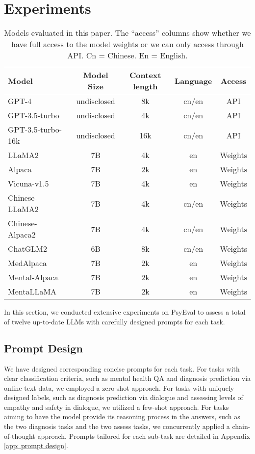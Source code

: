 
\section{Experiments}
\begin{table*}[t!]
\centering
\footnotesize
\begin{tabular}{l c c c c}
\hline
\textbf{Model} & \textbf{Model Size} & \textbf{Context length} & \textbf{Language} & \textbf{Access}\\
\hline
GPT-4~\cite{openai2023gpt4} & undisclosed & 8k & cn/en & API \\
GPT-3.5-turbo~\cite{schulman2022chatgpt} & undisclosed & 4k & cn/en & API\\
GPT-3.5-turbo-16k~\cite{schulman2022chatgpt} & undisclosed & 16k & cn/en & API\\
\hline
LLaMA2~\cite{touvron2023llama} & 7B & 4k & en & Weights\\
Alpaca~\cite{alpaca} & 7B & 2k & en & Weights\\
Vicuna-v1.5~\cite{chiang2023vicuna} & 7B & 4k & en & Weights\\
\hline
Chinese-LLaMA2~\cite{Chinese-LLaMA-Alpaca} & 7B & 4k & cn/en & Weights\\
Chinese-Alpaca2~\cite{Chinese-LLaMA-Alpaca} & 7B & 4k & cn/en & Weights\\
ChatGLM2~\cite{du2022glm, zeng2022glm} & 6B & 8k & cn/en & Weights\\
\hline
MedAlpaca~\cite{han2023medalpaca} & 7B & 2k & en & Weights\\
Mental-Alpaca~\cite{xu2023leveraging} & 7B & 2k & en & Weights\\
MentaLLaMA~\cite{yang2023mentalllama} & 7B & 2k & en & Weights\\
\hline
\end{tabular}
\caption{Models evaluated in this paper. The “access” columns show whether we have full access to the model weights or we can only access through API. Cn = Chinese. En = English.} 
\label{tab:models}
\end{table*}
In this section, we conducted extensive experiments on PsyEval to assess a total of twelve up-to-date LLMs with carefully designed prompts for each task.

\subsection{Prompt Design}
We have designed corresponding concise prompts for each task. For tasks with clear classification criteria, such as mental health QA and diagnosis prediction via online text data, we employed a zero-shot approach. For tasks with uniquely designed labels, such as diagnosis prediction via dialogue and assessing levels of empathy and safety in dialogue, we utilized a few-shot approach. For tasks aiming to have the model provide its reasoning process in the answers, such as the two diagnosis tasks and the two assess tasks, we concurrently applied a chain-of-thought approach. Prompts tailored for each sub-task are detailed in Appendix \ref{app: prompt design}. 

